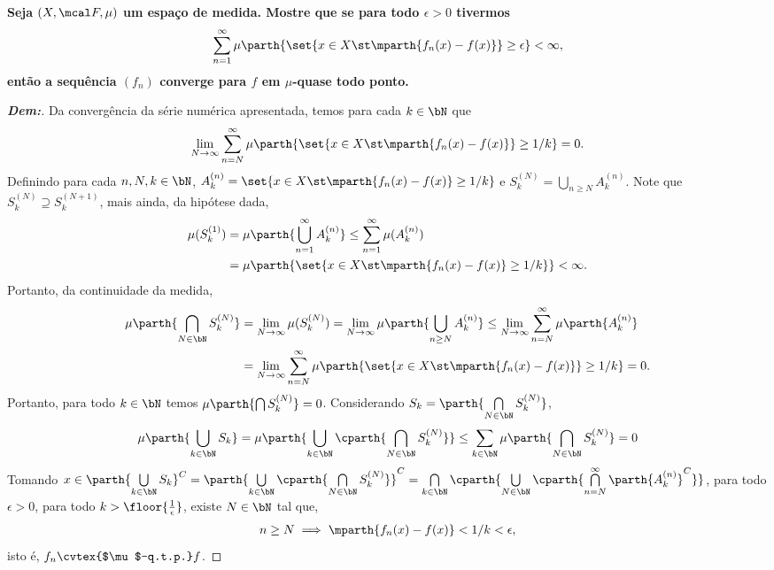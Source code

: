 \textbf{Seja $(X, \mcal F, \mu)$ um espaço de medida. Mostre que se para todo $\epsilon>0$
tivermos 
\begin{align*}
  \sum_{n=1}^\infty \mu\parth{\set{x \in X \st \mparth{f_n(x) - f(x)}}\ge \epsilon}<\infty,
\end{align*}
então a sequência $(f_n)$ converge para $f$ em $\mu$-quase todo ponto.}
\begin{proof}[\textbf{Dem:}] Da convergência da série
  numérica apresentada, temos para cada $k \in \bN$ que 
  \begin{align*}
    \lim_{N \rightarrow \infty} \sum_{n = N}^{\infty} \mu\parth{\set{x \in X \st 
    \mparth{f_n(x) - f(x)}}\ge 1/k} = 0.
  \end{align*}
  Definindo para cada $n, N, k \in \bN$, 
  $A_{k}^{(n)} = \set{x \in X \st \mparth{f_n(x) - f(x)}\ge 1/k}$
  e $S_k^{(N)} = \bigcup_{n \ge N} A_{k}^{(n)}$. Note que 
  $S_k^{(N)} \supseteq S_k^{(N+1)}$, mais ainda, da hipótese dada,
  \begin{align*}
    \mu(S_k^{(1)}) &= \mu\parth{\bigcup_{n = 1}^\infty A_{k}^{(n)}} \le \sum_{n=1}^\infty 
    \mu(A_{k}^{(n)})\\
    &=\mu\parth{\set{x \in X \st \mparth{f_n(x) - f(x)}\ge 1/k}}<\infty.
  \end{align*}
  Portanto, da continuidade da medida,
  \begin{align*}
    \mu\parth{\bigcap_{N \in \bN} S_k^{(N)}} &= \lim_{N \rightarrow \infty} \mu(S_k^{(N)}) 
    = \lim_{N \rightarrow\infty} \mu\parth{\bigcup_{n \ge N} A_{k}^{(n)}}
    \le \lim_{N \rightarrow\infty} \sum_{n = N}^\infty \mu\parth{A_k^{(n)}}\\ 
   &= \lim_{N \rightarrow \infty} \sum_{n = N}^{\infty} \mu\parth{\set{x \in X \st 
    \mparth{f_n(x) - f(x)}}\ge 1/k} = 0.
  \end{align*}
  Portanto, para todo $k \in \bN$ temos $\mu\parth{\bigcap S_k^{(N)}} = 0$. 
  Considerando $S_k = \parth{\bigcap\limits_{N \in \bN} S_k^{(N)}}$, 
  \begin{align*}
    \mu\parth{\bigcup_{k \in \bN}S_k} = 
    \mu\parth{\bigcup_{k \in \bN} \cparth{\bigcap\limits_{N \in \bN} S_k^{(N)}}} 
    \le \sum_{k \in \bN} 
    \mu{\parth{\bigcap\limits_{N \in \bN} S_k^{(N)}}} = 0
  \end{align*}
  Tomando $x \in 
  \parth{\bigcup\limits_{k \in \bN} S_k}^C = \parth{\bigcup\limits_{k \in \bN} 
  \cparth{\bigcap\limits_{N \in \bN} S_k^{(N)}}}^C = \bigcap\limits_{k \in \bN}
  \cparth{\bigcup\limits_{N \in \bN} 
  \cparth{\bigcap\limits_{n = N}^\infty \parth{A_{k}^{(n)}}^{C}}}$,
  para todo $\epsilon>0$, para todo $k > \floor{\frac{1}{\epsilon}}$, 
  existe $N \in \bN$ tal que, 
  \begin{align*}
    n \ge N \implies \mparth{f_n(x) - f(x)} < 1/k < \epsilon,
  \end{align*}
  isto é, $f_n \cvtex{$\mu$-q.t.p.} f$.
\end{proof}

